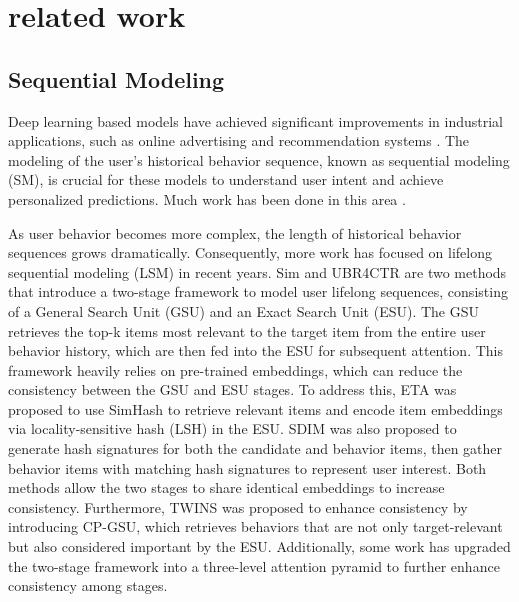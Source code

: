 \section{related work}

\subsection{Sequential Modeling}

Deep learning based models have achieved significant improvements in industrial applications, such as online advertising and recommendation systems \cite{cheng2016wide, qu2016product, wang2017deep, guo2017deepfm, wang2021dcn, lian2018xdeepfm, song2019autoint, zhou2018deep, pi2020search, xiao2017attentional}. The modeling of the user's historical behavior sequence, known as sequential modeling (SM), is crucial for these models to understand user intent and achieve personalized predictions. Much work has been done in this area \cite{zhou2018deep, pi2020search, zhou2019deep, feng2019deep, chen2022efficient, chang2023twin}.

As user behavior becomes more complex, the length of historical behavior sequences grows dramatically. Consequently, more work has focused on lifelong sequential modeling (LSM) in recent years. Sim \cite{pi2020search} and UBR4CTR \cite{qin2020user} are two methods that introduce a two-stage framework to model user lifelong sequences, consisting of a General Search Unit (GSU) and an Exact Search Unit (ESU). The GSU retrieves the top-k items most relevant to the target item from the entire user behavior history, which are then fed into the ESU for subsequent attention. This framework heavily relies on pre-trained embeddings, which can reduce the consistency between the GSU and ESU stages. To address this, ETA \cite{chen2022efficient} was proposed to use SimHash \cite{charikar2002similarity} to retrieve relevant items and encode item embeddings via locality-sensitive hash (LSH) in the ESU. SDIM \cite{cao2022sampling} was also proposed to generate hash signatures for both the candidate and behavior items, then gather behavior items with matching hash signatures to represent user interest. Both methods allow the two stages to share identical embeddings to increase consistency. Furthermore, TWINS \cite{chang2023twin} was proposed to enhance consistency by introducing CP-GSU, which retrieves behaviors that are not only target-relevant but also considered important by the ESU. Additionally, some work has upgraded the two-stage framework into a three-level attention pyramid \cite{hou2024cross} to further enhance consistency among stages.

